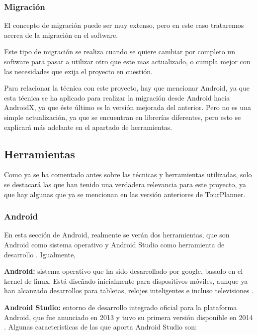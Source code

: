 \subsubsection{Migración}

El concepto de migración puede ser muy extenso, pero en este caso trataremos acerca de la migración en el software.

Este tipo de migración se realiza cuando se quiere cambiar por completo un software para pasar a utilizar otro que este mas actualizado, o cumpla mejor con las necesidades que exija el proyecto en cuestión. 

Para relacionar la técnica con este proyecto, hay que mencionar Android, ya que esta técnica se ha aplicado para realizar la migración desde Android hacia AndroidX, ya que éste último es la versión mejorada del anterior. Pero no es una simple actualización, ya que se encuentran en librerías diferentes, pero esto se explicará más adelante en el apartado de herramientas.


\subsection{Herramientas}

Como ya se ha comentado antes sobre las técnicas y herramientas utilizadas, solo se destacará las que han tenido una verdadera relevancia para este proyecto, ya que hay algunas que ya se mencionan en las versión anteriores \cite{tfg1} \cite{tfm1} de TourPlanner.

\subsubsection{Android}

En esta sección de Android, realmente se verán dos herramientas, que son Android como sistema operativo \cite{android1} y Android Studio como herramienta de desarrollo \cite{as1}. Igualmente, 

\textbf{Android:} sistema operativo que ha sido desarrollado por google, basado en el kernel de linux. Está diseñado inicialmente para dispositivos móviles, aunque ya han alcanzado desarrollos para tabletas, relojes inteligentes e incluso televisiones \cite{android2}.

\textbf{Android Studio:} entorno de desarrollo integrado oficial para la plataforma Android, que fue anunciado en 2013 y tuvo su primera versión disponible en 2014 \cite{as2}. Algunas caracteristicas de las que aporta Android Studio son:


